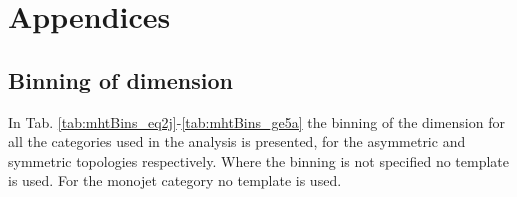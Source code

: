 \chapter{Appendices}
\label{app:appendices}

\section{Binning of \MHT dimension}
\label{sec:mhtBinning}
In Tab. \ref{tab:mhtBins_eq2j}-\ref{tab:mhtBins_ge5a} the binning of
the \mht dimension for all the categories used in the analysis is
presented, for the asymmetric and symmetric topologies respectively.
Where the binning is not specified no template is used.  For the
monojet category no template is used. 

